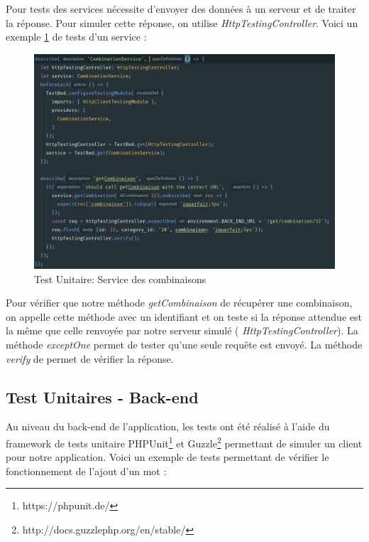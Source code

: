 \documentclass[12pt,a4paper]{article}
\begin{document}
    Pour tests des services nécessite d'envoyer des données à un serveur et de traiter la réponse.
    Pour simuler cette réponse, on utilise \textit{HttpTestingController}.
    Voici un exemple \ref{ServiceCombin} de tests d'un service : \newline
    \begin{figure}[h]
        \centering
        \includegraphics[width=170mm]{img/service Combinaison.PNG}
        \caption{Test Unitaire: Service des combinaisons}
        \label{ServiceCombin}
    \end{figure}

    Pour vérifier que notre méthode \textit{getCombinaison} de récupérer une combinaison, on appelle cette méthode avec un identifiant et on teste si la réponse attendue est la même que celle renvoyée par notre serveur simulé (  \textit{HttpTestingController}).
    La méthode \textit{exceptOne} permet de tester qu'une seule requête est envoyé.
    La méthode \textit{verify} de permet de vérifier la réponse. \newline

    \subsection{Test Unitaires - Back-end}

    Au niveau du back-end de l'application, les tests ont été réalisé à l'aide du framework de tests unitaire PHPUnit\footnote{https://phpunit.de/} et Guzzle\footnote{http://docs.guzzlephp.org/en/stable/} permettant de simuler un client pour notre application.
    Voici un exemple de tests permettant de vérifier le fonctionnement de l'ajout d'un mot :
\end{document}
